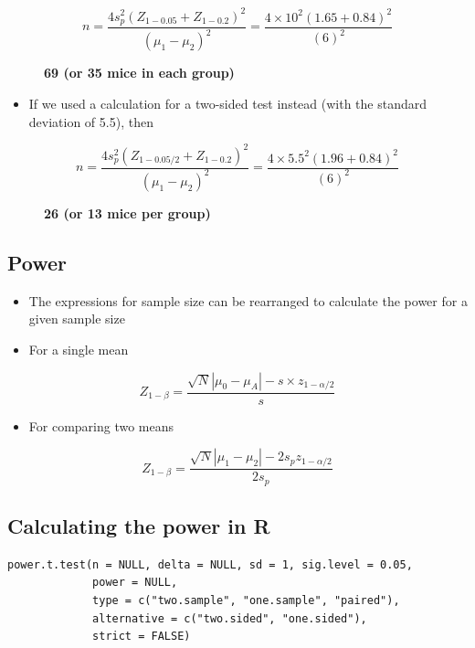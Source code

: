 \documentclass[
]{book}
\providecommand{\tightlist}{%
  \setlength{\itemsep}{0pt}\setlength{\parskip}{0pt}}
\begin{document}
\begin{description}
\item[\[n = \frac{4s_p^2(Z_{1-0.05}+Z_{1-0.2})^2}{(\mu_1-\mu_2)^2}=\frac{4\times 10^2(1.65+0.84)^2}{(6)^2}\]]
\textbf{69 (or 35 mice in each group)}
\end{description}

\begin{itemize}
\tightlist
\item
  If we used a calculation for a two-sided test instead (with the standard deviation of 5.5), then
\end{itemize}

\begin{description}
\item[\[n = \frac{4s_p^2(Z_{1-0.05/2}+Z_{1-0.2})^2}{(\mu_1-\mu_2)^2}=\frac{4\times 5.5^2(1.96+0.84)^2}{(6)^2}\]]
\textbf{26 (or 13 mice per group)}
\end{description}

\hypertarget{power-1}{%
\subsection{Power}\label{power-1}}

\begin{itemize}
\tightlist
\item
  The expressions for sample size can be rearranged to calculate the power for a given sample size
\item
  For a single mean
\end{itemize}

\[Z_{1-\beta}=\frac{\sqrt N|\mu_0-\mu_A|-s\times z_{1-\alpha/2}}{s}\]

\begin{itemize}
\tightlist
\item
  For comparing two means
\end{itemize}

\[Z_{1-\beta}=\frac{\sqrt N|\mu_1-\mu_2|-2s_pz_{1-\alpha/2}}{2s_p}\]

\hypertarget{calculating-the-power-in-r-1}{%
\subsection{Calculating the power in R}\label{calculating-the-power-in-r-1}}

\begin{verbatim}
power.t.test(n = NULL, delta = NULL, sd = 1, sig.level = 0.05,
             power = NULL,
             type = c("two.sample", "one.sample", "paired"),
             alternative = c("two.sided", "one.sided"),
             strict = FALSE)
\end{verbatim}
\end{document}
